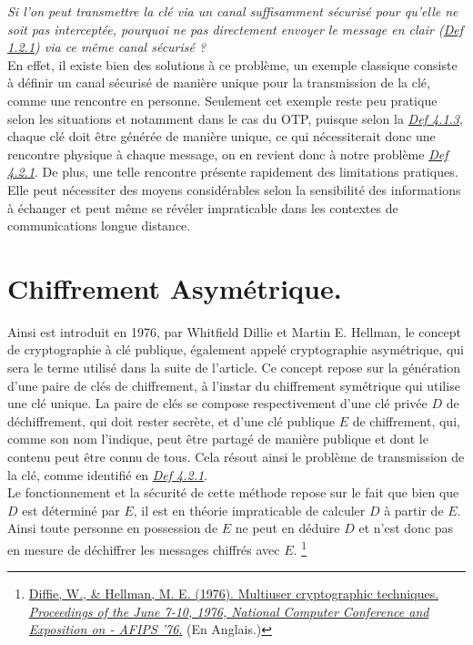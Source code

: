 \documentclass{article}
\begin{document}
\textit{Si l'on peut transmettre la clé via un canal suffisamment sécurisé
	pour qu'elle ne soit pas interceptée, pourquoi ne pas directement
	envoyer le message en clair (\hyperref[def-1.2.1]{Def 1.2.1}) via ce même
	canal sécurisé ?} \\

En effet, il existe bien des solutions à ce problème, un exemple
classique consiste à définir un canal sécurisé de manière unique pour la
transmission de la clé, comme une rencontre en personne. Seulement cet
exemple reste peu pratique selon les situations et notamment dans le cas
du OTP, puisque selon la \textit{\hyperref[def-4.1.3]{Def 4.1.3}},
chaque clé doit être générée de manière unique, ce qui nécessiterait
donc une rencontre physique à chaque message, on en revient donc à notre
problème \textit{\hyperref[def-4.2.1]{Def 4.2.1}}. De plus, une telle
rencontre présente rapidement des limitations pratiques. Elle peut
nécessiter des moyens considérables selon la sensibilité des
informations à échanger et peut même se révéler impraticable dans les
contextes de communications longue distance.

\section{Chiffrement Asymétrique.}\label{chiffrement-asymuxe9trique-et-algorithme-rsa.}

Ainsi est introduit en 1976, par Whitfield Dillie et Martin E. Hellman,
le concept de cryptographie à clé publique, également appelé
cryptographie asymétrique, qui sera le terme utilisé dans la suite de
l'article. Ce concept repose sur la génération d'une paire de clés de
chiffrement, à l'instar du chiffrement symétrique qui utilise une clé
unique. La paire de clés se compose respectivement d'une clé privée
\(D\) de déchiffrement, qui doit rester secrète, et d'une clé publique
\(E\) de chiffrement, qui, comme son nom l'indique, peut être partagé de
manière publique et dont le contenu peut être connu de tous. Cela résout
ainsi le problème de transmission de la clé, comme identifié en
\textit{\hyperref[def-4.2.1]{Def 4.2.1}}. \\

Le fonctionnement et la sécurité de cette méthode repose sur le fait que
bien que \(D\) est déterminé par \(E\), il est en théorie impraticable
de calculer \(D\) à partir de \(E\). Ainsi toute personne en possession
de \(E\) ne peut en déduire \(D\) et n'est donc pas en mesure de
déchiffrer les messages chiffrés avec \(E\).
\footnote{\href{https://dl.acm.org/doi/pdf/10.1145/1499799.1499815}{Diffie,
		W., \& Hellman, M. E. (1976). Multiuser cryptographic techniques.
		\textit{Proceedings of the June 7-10, 1976, National Computer Conference
			and Exposition on - AFIPS '76}.} (En Anglais.)} \\
\end{document}
